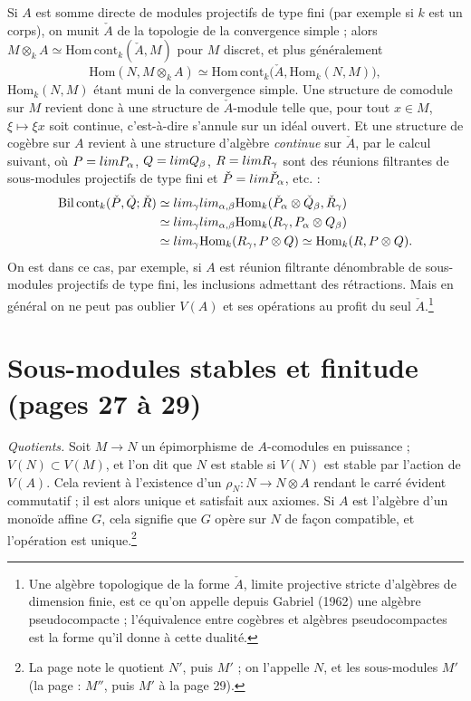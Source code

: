 \documentclass[11pt,a4paper]{article}
\begin{document}
Si $A$ est somme directe de modules projectifs de type fini (par exemple si
$k$ est un corps), on munit $\check{A}$ de la topologie de la convergence
simple ; alors $M \otimes_{k} A \simeq \mathrm{Hom\,cont}_{k}(\check{A}, M)$
pour $M$ discret, et plus généralement
\[
  \mathrm{Hom}(N, M \otimes_{k} A) \simeq
  \mathrm{Hom\,cont}_{k}\bigl(\check{A}, \mathrm{Hom}_{k}(N, M)\bigr),
\]
$\mathrm{Hom}_{k}(N, M)$ étant muni de la convergence simple. Une structure
de comodule sur $M$ revient donc à une structure de $\check{A}$-module telle
que, pour tout $x \in M$, $\xi \mapsto \xi x$ soit continue,
c'est-à-dire s'annule sur un idéal ouvert. Et une structure de cogèbre sur
$A$ revient à une structure d'algèbre \emph{continue} sur $\check{A}$, par le
calcul suivant, où $P = \varinjlim P_{\alpha}$, $Q = \varinjlim Q_{\beta}$,
$R = \varinjlim R_{\gamma}$ sont des réunions filtrantes de sous-modules
projectifs de type fini et $\check{P} = \varprojlim \check{P}_{\alpha}$,
etc. :
\begin{align*}
  \mathrm{Bil\,cont}_{k}(\check{P}, \check{Q}; \check{R})
  &\simeq \varprojlim_{\gamma} \varinjlim_{\alpha,\beta}
     \mathrm{Hom}_{k}(\check{P}_{\alpha} \otimes \check{Q}_{\beta}, \check{R}_{\gamma}) \\
  &\simeq \varprojlim_{\gamma} \varinjlim_{\alpha,\beta}
     \mathrm{Hom}_{k}(R_{\gamma}, P_{\alpha} \otimes Q_{\beta}) \\
  &\simeq \varprojlim_{\gamma} \mathrm{Hom}_{k}(R_{\gamma}, P \otimes Q)
   \simeq \mathrm{Hom}_{k}(R, P \otimes Q) .
\end{align*}
On est dans ce cas, par exemple, si $A$ est réunion filtrante dénombrable de
sous-modules projectifs de type fini, les inclusions admettant des
rétractions. Mais en général on ne peut pas oublier $V(A)$ et ses opérations
au profit du seul $\check{A}$.\footnote{Une algèbre topologique de la forme
$\check{A}$, limite projective stricte d'algèbres de dimension finie, est ce
qu'on appelle depuis Gabriel (1962) une algèbre pseudocompacte ; l'équivalence
entre cogèbres et algèbres pseudocompactes est la forme qu'il donne à cette
dualité.}

\section*{Sous-modules stables et finitude (pages 27 à 29)}

\emph{Quotients.} Soit $M \to N$ un épimorphisme de $A$-comodules en
puissance ; $V(N) \subset V(M)$, et l'on dit que $N$ est stable si $V(N)$ est
stable par l'action de $V(A)$. Cela revient à l'existence d'un
$\rho_{N} \colon N \to N \otimes A$ rendant le carré évident commutatif ; il est
alors unique et satisfait aux axiomes. Si $A$ est l'algèbre d'un monoïde
affine $G$, cela signifie que $G$ opère sur $N$ de façon compatible, et
l'opération est unique.\footnote{La page note le quotient $N'$, puis $M'$ ; on
l'appelle $N$, et les sous-modules $M'$ (la page : $M''$, puis $M'$ à la
page 29).}
\end{document}
